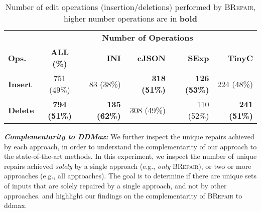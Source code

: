 \documentclass[sigconf,review,anonymous]{acmart}
\newcommand{\approach}{\textsc{BRepair}\xspace}
\newcommand{\ddmax}{\textit{DDMax}\xspace}
\begin{document}
\begin{table}[!tbp]\centering
\caption{Number of edit operations (insertion/deletions) performed by \approach, higher number operations are in \textbf{bold}}
\small
\begin{tabular}{|l | c | r  r  r  r |}
\hline
&  \multicolumn{5}{c|}{\textbf{Number of  Operations}}  \\
\textbf{Ops.} & \textbf{ALL (\%)} & \textbf{INI} & \textbf{cJSON} & \textbf{SExp} & \textbf{TinyC} \\
\hline
\textbf{Insert} & 751 (49\%) & 83 (38\%) &	\textbf{318 (51\%)} &	\textbf{126 (53\%)} &	224 (48\%) \\
\textbf{Delete}  & \textbf{794 (51\%)} & \textbf{135 (62\%)} &	308 (49\%) &	110 (52\%) &	\textbf{241 (51\%)} \\
\hline
\end{tabular}
\label{tab:brepair-insertions}
\end{table}



\noindent \textbf{\textit{Complementarity to \ddmax:}} We further inspect the unique repairs achieved by each approach, in order to understand the complementarity of our approach to the state-of-the-art methods. In this experiment, we inspect the number of unique repairs achieved \textit{solely} by a single approach (e.g., \textit{only} \approach), or two or more approaches (e.g., all approaches).  The goal is to determine if there are unique sets of inputs that are solely repaired by a single approach, and not by other approaches.  and  highlight our findings on the complementarity of \approach to ddmax.
\end{document}
